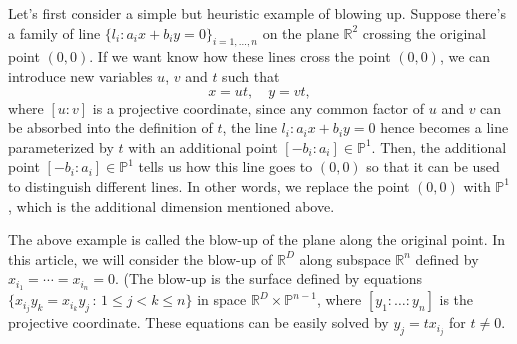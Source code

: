 \documentclass[12pt]{article}
\theoremstyle{definition}
\theoremstyle{plain}
\begin{document}
Let's first consider a simple but heuristic example of blowing up. 
Suppose there's a family of line $\{l_i: a_ix+b_iy=0\}_{i=1,\dots,n}$ on the plane 
$\mathbb R^2$
crossing the original point $(0,0)$. 
If we want know how these lines cross the point $(0,0)$, we can introduce 
new variables $u$, $v$ and $t$ such that
\[
	x=ut,\quad y=vt,
\] 
where $[u:v]$ is a projective coordinate, since any common factor of $u$ and $v$ can be absorbed into the definition of $t$, the line $l_i:a_ix+b_iy=0$ hence becomes a line parameterized 
by $t$ with an additional point $[-b_i:a_i]\in \mathbb P^1$. Then, the additional point $[-b_i:a_i]\in \mathbb P^1$ tells us how this line goes to $(0,0)$ so that it can be used to distinguish different lines.
In other words, we replace the point $(0,0)$ with $\mathbb P^1$, which is the additional
dimension mentioned above. 


The above example is called the blow-up of the plane along the original point.
In this article, we will consider the blow-up of $\mathbb R^D$
along subspace $\mathbb R^n$ defined by $x_{i_1}=\cdots=x_{i_n}=0$. 
(The blow-up is the surface defined by equations $\{x_{i_j}y_k=x_{i_k}y_j\,:\, 1\leq j<k\leq n\}$ in space 
$\mathbb R^{D}\times \mathbb P^{n-1}$,
where $[y_1:\dots:y_n]$ is the projective coordinate. 
These equations can be easily
solved by $y_j=tx_{i_j}$ for $t\neq 0$.

\end{document}
